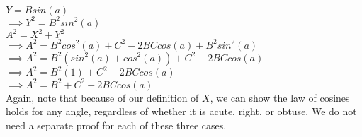 \tab $Y = B sin(a)$\\

\tab $\implies Y^2 = B^2 sin^2(a)$\\

\tab $A^2 = X^2 + Y^2$\\

\tab $\implies A^2 = B^2 cos^2(a) + C^2 - 2BC cos(a) + B^2 sin^2(a)$\\

\tab $\implies A^2 = B^2(sin^2(a) + cos^2(a)) + C^2 - 2BC cos(a)$\\

\tab $\implies A^2 = B^2(1) + C^2 - 2BC cos(a)$\\

\tab $\implies A^2 = B^2 + C^2 - 2BC cos(a)$\\

Again, note that because of our definition of $X$, we can show the law of cosines holds for any angle, regardless of whether it is acute, right, or obtuse.  We do not need a separate proof for each of these three cases.\\

